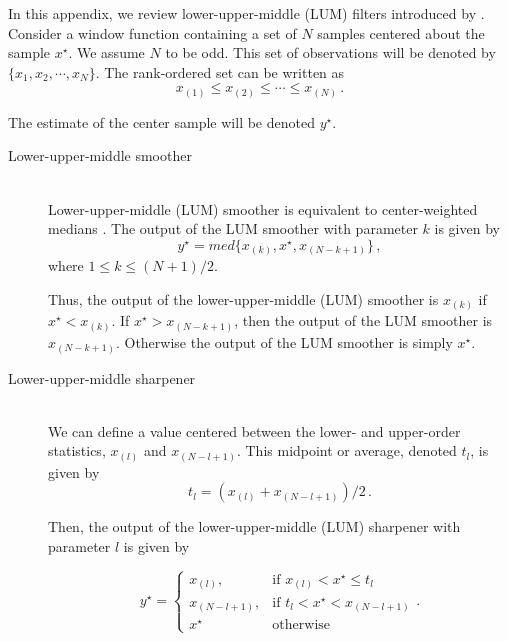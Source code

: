 In this appendix, we review lower-upper-middle (LUM)
filters introduced by \cite{Hardie93}. Consider a window function
containing a set of $N$ samples centered about the sample $x^{\star}$. We
assume $N$ to be odd. This set of observations will be denoted by
$\{x_1,x_2,\cdots,x_N\}$. The rank-ordered set can be written as
\begin{equation}
   x_{(1)} \le x_{(2)} \le \cdots \le x_{(N)}\,.
  \label{eq:lum1}
\end{equation}

The estimate of the center sample will be denoted $y^{\star}$.

\begin{description} 
      \item[Lower-upper-middle smoother] \ \\
Lower-upper-middle (LUM) smoother is equivalent to 
center-weighted medians \cite[]{Justusson81}. The output of the LUM
smoother with parameter $k$ is given by
\begin{equation}
    y^{\star} = med \{x_{(k)},x^{\star},x_{(N-k+1)}\}\,,
  \label{eq:lumsm} 
\end{equation}
where $1 \le k \le (N+1)/2$.

Thus, the output of the lower-upper-middle (LUM)
smoother is $x_{(k)}$ if $x^{\star} < x_{(k)}$. If $x^{\star} > x_{(N-k+1)}$, then
the output of the LUM smoother is $x_{(N-k+1)}$. Otherwise the output
of the LUM smoother is simply $x^{\star}$.

     \item[Lower-upper-middle sharpener] \ \\
We can define a value centered between the lower- and upper-order
statistics, $x_{(l)}$ and $x_{(N-l+1)}$. This midpoint or average,
denoted $t_l$, is given by
\begin{equation}
   t_l = (x_{(l)}+x_{(N-l+1)})/2\,.
  \label{eq:lumsh1}
\end{equation}

Then, the output of the lower-upper-middle (LUM)
sharpener with parameter $l$ is given by 

\begin{equation}
   y^{\star} = \left\{ \begin{array}{ll} x_{(l)}, &
 \textrm{if $x_{(l)}< x^{\star} \le t_l$}\\ x_{(N-l+1)}, & \textrm{if
 $t_{l}< x^{\star} < x_{(N-l+1)}$}\\ x^{\star} & \textrm{otherwise}
\end{array} \right..
 \label{eq:lumsh2} 
\end{equation}


\end{description}
